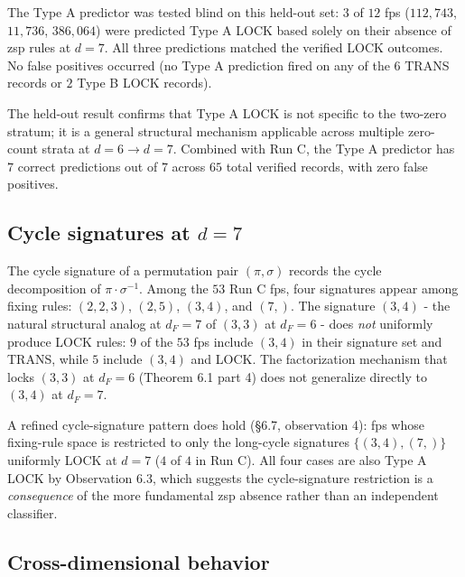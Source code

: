 \documentclass[11pt,letterpaper]{article}
\theoremstyle{paperstyle}
\theoremstyle{paperstyledef}
\theoremstyle{paperstylerem}
\begin{document}
The Type A predictor was tested blind on this held-out set: \(3\) of
\(12\) fps (\(112{,}743\), \(11{,}736\), \(386{,}064\)) were predicted
Type A LOCK based solely on their absence of zsp rules at \(d = 7\). All
three predictions matched the verified LOCK outcomes. No false positives
occurred (no Type A prediction fired on any of the \(6\) TRANS records
or \(2\) Type B LOCK records).

The held-out result confirms that Type A LOCK is not specific to the
two-zero stratum; it is a general structural mechanism applicable across
multiple zero-count strata at \(d = 6 \to d = 7\). Combined with Run C,
the Type A predictor has \(7\) correct predictions out of \(7\) across
\(65\) total verified records, with zero false positives.

\hypertarget{d.4-cycle-signatures-at-d-7}{%
\subsection{\texorpdfstring{Cycle signatures at \(d = 7\)}{Cycle signatures at d = 7}}\label{d.4-cycle-signatures-at-d-7}}

The cycle signature of a permutation pair \((\pi, \sigma)\) records the
cycle decomposition of \(\pi \cdot \sigma^{-1}\). Among the \(53\) Run C
fps, four signatures appear among fixing rules: \((2, 2, 3)\),
\((2, 5)\), \((3, 4)\), and \((7,)\). The signature \((3, 4)\) - the
natural structural analog at \(d_F = 7\) of \((3, 3)\) at \(d_F = 6\) - does \emph{not} uniformly produce LOCK rules: \(9\) of the \(53\)
fps include \((3, 4)\) in their signature set and TRANS, while \(5\)
include \((3, 4)\) and LOCK. The factorization mechanism that locks
\((3, 3)\) at \(d_F = 6\) (Theorem 6.1 part 4) does not generalize
directly to \((3, 4)\) at \(d_F = 7\).

A refined cycle-signature pattern does hold (§6.7, observation 4): fps
whose fixing-rule space is restricted to only the long-cycle signatures
\(\{(3, 4), (7,)\}\) uniformly LOCK at \(d = 7\) (\(4\) of \(4\) in Run
C). All four cases are also Type A LOCK by Observation 6.3, which
suggests the cycle-signature restriction is a \emph{consequence} of the
more fundamental zsp absence rather than an independent classifier.

\hypertarget{d.5-cross-dimensional-behavior}{%
\subsection{Cross-dimensional behavior}\label{d.5-cross-dimensional-behavior}}
\end{document}
